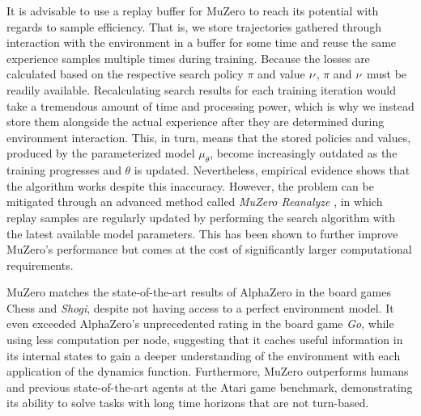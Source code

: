 It is advisable to use a replay buffer for MuZero to reach its potential with regards to sample efficiency. That is, we store trajectories gathered through interaction with the environment in a buffer for some time and reuse the same experience samples multiple times during training. Because the losses are calculated based on the respective search policy $\pi$ and value $\nu$, $\pi$ and $\nu$ must be readily available. Recalculating search results for each training iteration would take a tremendous amount of time and processing power, which is why we instead store them alongside the actual experience after they are determined during environment interaction. This, in turn, means that the stored policies and values, produced by the parameterized model $\mu_\theta$, become increasingly outdated as the training progresses and $\theta$ is updated. Nevertheless, empirical evidence shows that the algorithm works despite this inaccuracy. However, the problem can be mitigated through an advanced method called \textit{MuZero Reanalyze} \cite{muzero}, in which replay samples are regularly updated by performing the search algorithm with the latest available model parameters. This has been shown to further improve MuZero's performance but comes at the cost of significantly larger computational requirements.

MuZero matches the state-of-the-art results of AlphaZero in the board games Chess and \textit{Shogi}, despite not having access to a perfect environment model. It even exceeded AlphaZero's unprecedented rating in the board game \textit{Go}, while using less computation per node, suggesting that it caches useful information in its internal states to gain a deeper understanding of the environment with each application of the dynamics function. Furthermore, MuZero outperforms humans and previous state-of-the-art agents at the Atari game benchmark, demonstrating its ability to solve tasks with long time horizons that are not turn-based.